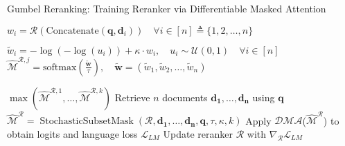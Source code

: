 \begin{center}
\begin{algorithm*}
\caption{Gumbel Reranking: Training Reranker via Differentiable Masked Attention}
\label{alg:ranker_as_selector}
\begin{algorithmic}[1]
    \State $w_i = \mathcal{R}( \text{Concatenate}(\mathbf{q}, \mathbf{d}_i))\quad \forall i \in [n] \triangleq \{1, 2, \dots, n\}$  

        \State $\tilde{w}_i = -\log(-\log(u_i)) + \kappa \cdot w_i,\quad u_i \sim \mathcal{U}(0, 1) \quad \forall i \in [n]$ 
        \State $\hat{\mathcal{M}}^{\mathcal{R},j} = \text{softmax}\left(\frac{\tilde{\mathbf{w}}}{\tau}\right), \quad \tilde{\mathbf{w}} = (\tilde{w}_1, \tilde{w}_2, \ldots, \tilde{w}_n)$
    \EndFor

    \State \Return $\max ( \hat{\mathcal{M}}^{\mathcal{R},1}, \dots, \hat{\mathcal{M}}^{\mathcal{R},k} )$ 
\EndProcedure
\State
{} 
    \State Retrieve $n$ documents $\mathbf{d_1}, \dots, \mathbf{d_n}$ using $\mathbf{q}$
    \State $\hat{\mathcal{M}}^\mathcal{R} = \operatorname{StochasticSubsetMask}(\mathcal{R}, \mathbf{d_1}, \dots, \mathbf{d_n}, \mathbf{q}, \tau, \kappa, k)$
    \State Apply $\mathcal{DMA}$($\hat{\mathcal{M}}^\mathcal{R}$) to obtain logits and language loss $\mathcal{L}_{LM}$  
    \State Update reranker $\mathcal{R}$ with $\nabla_{\mathcal{R}} \mathcal{L}_{LM}$ 
\EndFor

\end{algorithmic}
\end{algorithm*}
\end{center}